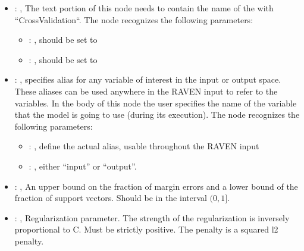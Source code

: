 \begin{itemize}
\begin{itemize}
        \item {}: ,
          List of IDs of features/variables to include in the transformation process.

        \item {}: ,
          Which space to search? Target or Feature?
      \end{itemize}

    \item {}: ,
      The text portion of this node needs to contain the name of the  with
               ``CrossValidation``.
      The  node recognizes the following parameters:
        \begin{itemize}
          \item {}: ,
            should be set to 
          \item {}: ,
            should be set to 
      \end{itemize}

    \item {}: ,
      specifies alias for         any variable of interest in the input or output space. These
      aliases can be used anywhere in the RAVEN input to         refer to the variables. In the body
      of this node the user specifies the name of the variable that the model is going to use
      (during its execution).
      The  node recognizes the following parameters:
        \begin{itemize}
          \item {}: ,
            define the actual alias, usable throughout the RAVEN input
          \item {}: ,
            either ``input'' or ``output''.
      \end{itemize}

    \item {}: ,
      An upper bound on the fraction of margin errors and
      a lower bound of the fraction of support vectors. Should be in the interval $(0, 1]$.

    \item {}: ,
      Regularization parameter. The strength of the regularization is inversely
      proportional to C.                                                           Must be strictly
      positive. The penalty is a squared l2 penalty.


\end{itemize}

